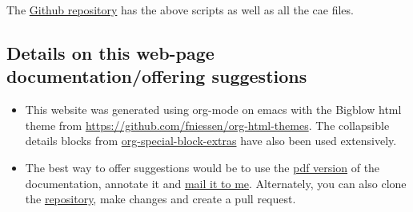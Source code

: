 \documentclass[11pt]{article}
\begin{document}
The \href{https://github.com/Nidish96/Abaqus4Joints}{Github repository} has the above scripts as well as all the cae files.
\subsection{Details on this web-page documentation/offering suggestions}
\label{sec:orgde696c8}
\begin{itemize}
\item This website was generated using org-mode on emacs with the Bigblow html theme from
\href{https://github.com/fniessen/org-html-themes}{https://github.com/fniessen/org-html-themes}.
The collapsible details blocks from \href{https://github.com/alhassy/org-special-block-extras}{org-special-block-extras} have also been used extensively.
\item The best way to offer suggestions would be to use the \href{https://github.com/Nidish96/Abaqus4Joints/blob/main/docs/index.pdf}{pdf version} of the documentation, annotate it and \href{mailto:nidish.balaji@ila.uni-stuttgart.de}{mail it to me}.
Alternately, you can also clone the \href{https://github.com/Nidish96/Abaqus4Joints}{repository}, make changes and create a pull request.
\end{itemize}
\end{document}
